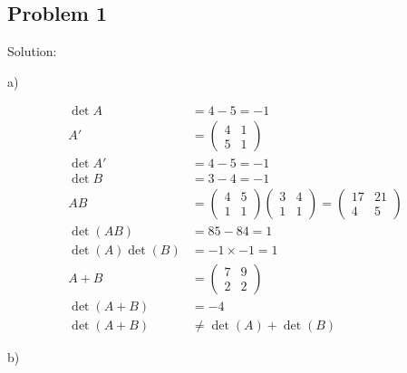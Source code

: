 \documentclass[letterpaper, 11pt]{article}
\newcommand{\1}{\mathds{1}}	%
\theoremstyle{definition}
\begin{document}
\subsection*{Problem 1}

Solution:

a)

\begin{align*}
    \det A &= 4- 5 = -1 \\
    A' &= \begin{pmatrix}
        4 & 1 \\
        5 & 1
    \end{pmatrix} \\
    \det A' &= 4 - 5 = -1 \\
    \det B &= 3 - 4 = -1 \\
    AB &= \begin{pmatrix}
        4 & 5 \\
        1 & 1
    \end{pmatrix} \begin{pmatrix}
        3 & 4 \\
        1 & 1
    \end{pmatrix} = \begin{pmatrix}
        17 & 21 \\
        4 & 5
    \end{pmatrix} \\
    \det (AB) &= 85 - 84 = 1 \\
    \det (A) \det (B) &= -1 \times -1 = 1 \\
    A + B &= \begin{pmatrix}
        7 & 9 \\
        2 & 2
    \end{pmatrix} \\
    \det (A+B) &= -4 \\
    \det (A+B) &\neq \det (A) + \det (B)
\end{align*}


b)
\end{document}
